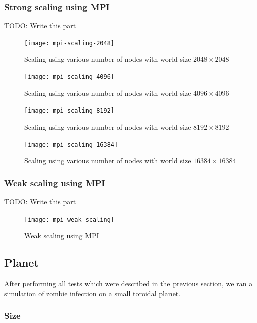 \documentclass[a4paper]{article}
\newcommand{\todo}[1]{}
\renewcommand{\todo}[1]{{\color{red} TODO: {#1}}}
\begin{document}
\subsubsection{Strong scaling using MPI}

\todo{Write this part}

\begin{figure}
    \centering
    \texttt{[image: mpi-scaling-2048]}
    \caption{Scaling using various number of nodes with world size $2048 \times 2048$}
\end{figure}

\begin{figure}
    \centering
    \texttt{[image: mpi-scaling-4096]}
    \caption{Scaling using various number of nodes with world size $4096 \times 4096$}
\end{figure}

\begin{figure}
    \centering
    \texttt{[image: mpi-scaling-8192]}
    \caption{Scaling using various number of nodes with world size $8192 \times 8192$}
\end{figure}

\begin{figure}
    \centering
    \texttt{[image: mpi-scaling-16384]}
    \caption{Scaling using various number of nodes with world size $16384 \times 16384$}
\end{figure}

\subsubsection{Weak scaling using MPI}

\todo{Write this part}

\begin{figure}
    \centering
    \texttt{[image: mpi-weak-scaling]}
    \caption{Weak scaling using MPI}
\end{figure}

\subsection{Planet}

After performing all tests which were described in the previous section, we ran a simulation of zombie infection on a small toroidal planet.

\subsubsection{Size}
\end{document}
